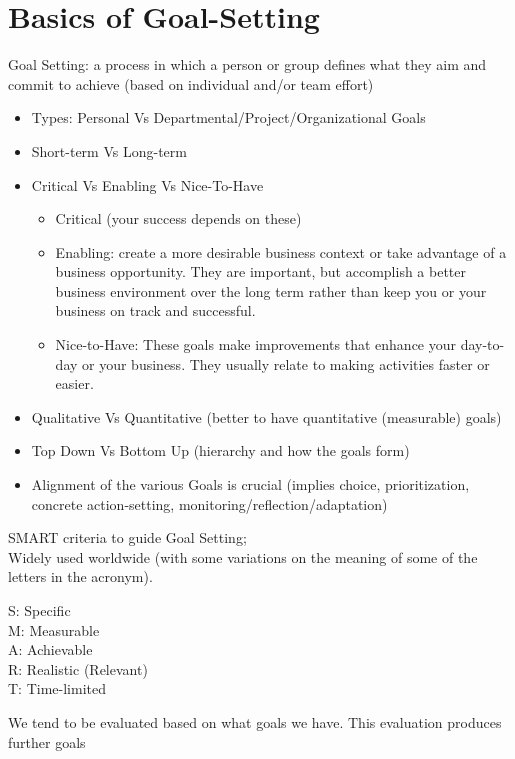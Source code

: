 \documentclass[]{project_plan}
\begin{document}
\newpage

\section{Basics of Goal-Setting}

Goal Setting: a process in which a person or group defines what they aim and commit to
achieve (based on individual and/or team effort)

\begin{itemize}
  \item Types: Personal Vs Departmental/Project/Organizational Goals
  \item Short-term Vs Long-term
  \item Critical Vs Enabling Vs Nice-To-Have
        \begin{itemize}
          \item Critical (your success depends on these)
          \item Enabling: create a more desirable business context or take advantage of a business opportunity. They are important, but accomplish a better business environment over the long term rather than keep you or your business on track and successful.
          \item Nice-to-Have: These goals make improvements that enhance your day-to-day or your  business. They usually relate to making activities faster or easier.
        \end{itemize}
  \item Qualitative Vs Quantitative (better to have quantitative (measurable) goals)
  \item Top Down Vs Bottom Up (hierarchy and how the goals form)
  \item Alignment of the various Goals is crucial (implies choice, prioritization, concrete action-setting, monitoring/reflection/adaptation)
\end{itemize}

SMART criteria to guide Goal Setting;\\
Widely used worldwide (with some variations on the meaning of some of the letters in the acronym).

S: Specific\\
M: Measurable\\
A: Achievable\\
R: Realistic (Relevant)\\
T: Time-limited

We tend to be evaluated based on what goals we have. This evaluation produces
further goals
\end{document}
